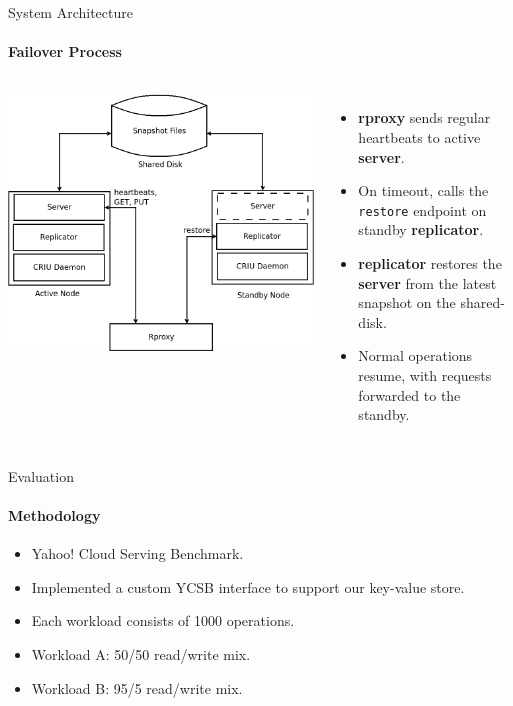\documentclass{beamer}
\begin{document}
\begin{frame}{System Architecture}
  \framesubtitle{Failover Process}

  \begin{columns}
    \includegraphics[scale=0.15]{../paper/arch}

    \begin{itemize}
      \item \textbf{rproxy} sends regular heartbeats to active \textbf{server}.
      \pause \item On timeout, calls the \texttt{restore} endpoint on standby \textbf{replicator}.
      \pause \item \textbf{replicator} restores the \textbf{server} from the latest snapshot on the shared-disk.
      \pause \item Normal operations resume, with requests forwarded to the standby.
    \end{itemize}
  \end{columns}
\end{frame}

\begin{frame}{Evaluation}
  \framesubtitle{Methodology}

  \begin{itemize}
    \item Yahoo! Cloud Serving Benchmark.
    \item Implemented a custom YCSB interface to support our key-value store.
    \item Each workload consists of 1000 operations.
    \item Workload A: 50/50 read/write mix.
    \item Workload B: 95/5 read/write mix.
  \end{itemize}
\end{frame}
\end{document}
